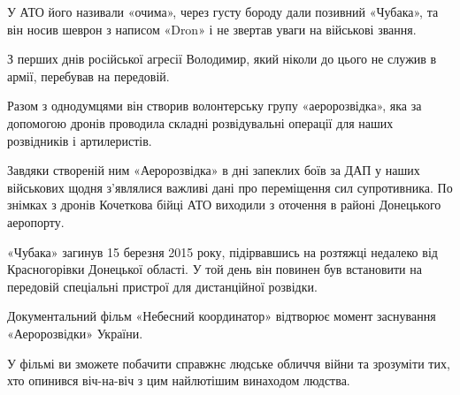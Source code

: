 У АТО його називали «очима», через густу бороду дали позивний «Чубака», та він
носив шеврон з написом «Dron» і не звертав уваги на військові звання.

З перших днів російської агресії Володимир, який ніколи до цього не служив в
армії, перебував на передовій.

Разом з однодумцями він створив волонтерську групу «аеророзвідка», яка за
допомогою дронів проводила складні розвідувальні операції для наших розвідників
і артилеристів.

Завдяки створеній ним «Аеророзвідка» в дні запеклих боїв за ДАП у наших
військових щодня з'являлися важливі дані про переміщення сил супротивника. По
знімках з дронів Кочеткова бійці АТО виходили з оточення в районі Донецького
аеропорту.

«Чубака» загинув 15 березня 2015 року, підірвавшись на розтяжці недалеко від
Красногорівки Донецької області. У той день він повинен був встановити на
передовій спеціальні пристрої для дистанційної розвідки.

Документальний фільм «Небесний координатор» відтворює момент заснування
«Аеророзвідки» України.

У фільмі ви зможете побачити справжнє людське обличчя війни та зрозуміти тих,
хто опинився віч-на-віч з цим найлютішим винаходом людства.
